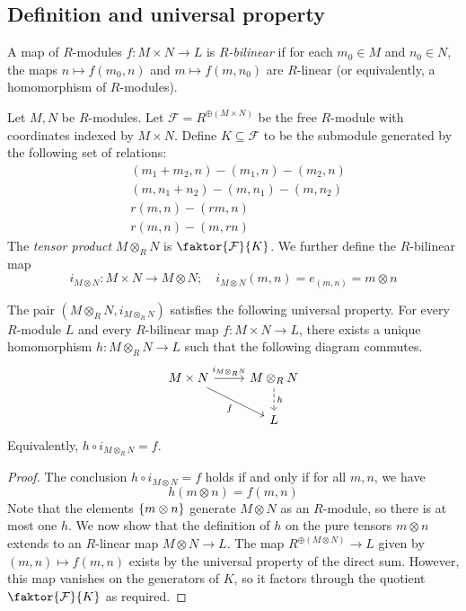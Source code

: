 \subsection{Definition and universal property}
\begin{definition}
    A map of \( R \)-modules \( f : M \times N \to L \) is \emph{\( R \)-bilinear} if for each \( m_0 \in M \) and \( n_0 \in N \), the maps \( n \mapsto f(m_0, n) \) and \( m \mapsto f(m, n_0) \) are \( R \)-linear (or equivalently, a homomorphism of \( R \)-modules).
\end{definition}
\begin{definition}
    Let \( M, N \) be \( R \)-modules.
    Let \( \mathcal F = R^{\oplus(M \times N)} \) be the free \( R \)-module with coordinates indexed by \( M \times N \).
    Define \( K \subseteq \mathcal F \) to be the submodule generated by the following set of relations:
    \begin{align*}
        &(m_1 + m_2, n) - (m_1, n) - (m_2, n) \\
        &(m, n_1 + n_2) - (m, n_1) - (m, n_2) \\
        &r (m, n) - (rm, n) \\
        &r (m, n) - (m, rn)
    \end{align*}
    The \emph{tensor product} \( M \otimes_R N \) is \( \faktor{\mathcal F}{K} \).
    We further define the \( R \)-bilinear map
    \[ i_{M \otimes N} : M \times N \to M \otimes N;\quad i_{M \otimes N}(m, n) = e_{(m, n)} = m \otimes n \]
\end{definition}
\begin{proposition}
    The pair \( (M \otimes_R N, i_{M \otimes_R N}) \) satisfies the following universal property.
    For every \( R \)-module \( L \) and every \( R \)-bilinear map \( f : M \times N \to L \), there exists a unique homomorphism \( h : M \otimes_R N \to L \) such that the following diagram commutes.
    \[\begin{tikzcd}
        {M \times N} & {M \otimes_R N} \\
        & L
        \arrow["{i_{M \otimes_R N}}", from=1-1, to=1-2]
        \arrow["h", dashed, from=1-2, to=2-2]
        \arrow["f"', from=1-1, to=2-2]
    \end{tikzcd}\]
    Equivalently, \( h \circ i_{M \otimes_R N} = f \).
\end{proposition}
\begin{proof}
    The conclusion \( h \circ i_{M \otimes N} = f \) holds if and only if for all \( m, n \), we have
    \[ h(m \otimes n) = f(m, n) \]
    Note that the elements \( \qty{m \otimes n} \) generate \( M \otimes N \) as an \( R \)-module, so there is at most one \( h \).
    We now show that the definition of \( h \) on the pure tensors \( m \otimes n \) extends to an \( R \)-linear map \( M \otimes N \to L \).
    The map \( R^{\oplus(M \otimes N)} \to L \) given by \( (m, n) \mapsto f(m, n) \) exists by the universal property of the direct sum.
    However, this map vanishes on the generators of \( K \), so it factors through the quotient \( \faktor{\mathcal F}{K} \) as required.
\end{proof}
